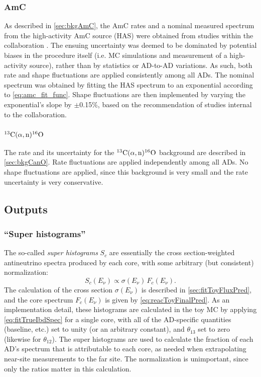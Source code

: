 \documentclass[../thesis.tex]{subfiles}
\begin{document}
\subsubsection{AmC}

As described in \autoref{sec:bkgAmC}, the AmC rates and a nominal measured spectrum from the high-activity AmC source (HAS) were obtained from studies within the collaboration \cite{AmC_paper}. The ensuing uncertainty was deemed to be dominated by potential biases in the procedure itself (i.e. MC simulations and measurement of a high-activity source), rather than by statistics or AD-to-AD variations. As such, both rate and shape fluctuations are applied consistently among all ADs. The nominal spectrum was obtained by fitting the HAS spectrum to an exponential according to \autoref{eq:amc_fit_func}. Shape fluctuations are then implemented by varying the exponential's slope by $\pm$0.15\%, based on the recommendation of studies internal to the collaboration.

\subsubsection{$^{13}\mathrm{C}(\alpha, \mathrm{n})^{16}\mathrm{O}$}

The rate and its uncertainty for the $^{13}\mathrm{C}(\alpha, \mathrm{n})^{16}\mathrm{O}$ background are described in \autoref{sec:bkgCanO}. Rate fluctuations are applied independently among all ADs. No shape fluctuations are applied, since this background is very small and the rate uncertainty is very conservative.

\subsection{Outputs}
\label{sec:fitToyOutputs}

\subsubsection{``Super histograms''}

The so-called \emph{super histograms} $S_c$ are essentially the cross section-weighted antineutrino spectra produced by each core, with some arbitrary (but consistent) normalization:
\begin{equation}
  S_c(E_\nu) \propto \sigma(E_\nu)\,F_c(E_\nu).
\end{equation}
The calculation of the cross section $\sigma(E_\nu)$ is described in \autoref{sec:fitToyFluxPred}, and the core spectrum $F_c(E_\nu)$ is given by \autoref{eq:reacToyFinalPred}. As an implementation detail, these histograms are calculated in the toy MC by applying \autoref{eq:fitTrueIbdSpec} for a single core, with all of the AD-specific quantities (baseline, etc.) set to unity (or an arbitrary constant), and $\theta_{13}$ set to zero (likewise for $\theta_{12}$). The super histograms are used to calculate the fraction of each AD's spectrum that is attributable to each core, as needed when extrapolating near-site measurements to the far site. The normalization is unimportant, since only the ratios matter in this calculation.
\end{document}
